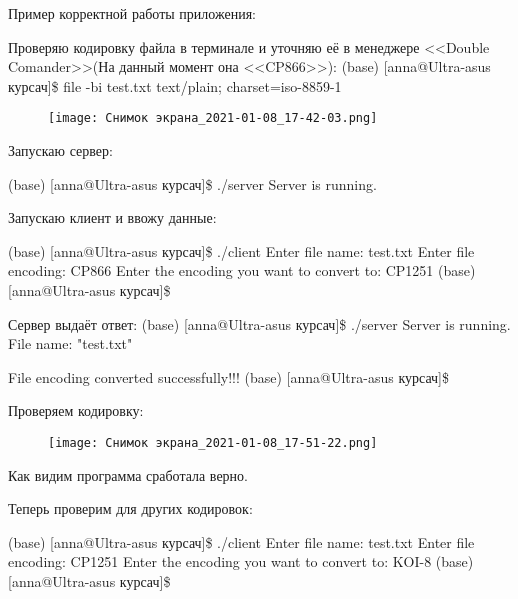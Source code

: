 \documentclass[a4paper,12pt]{extarticle}
\begin{document}
Пример корректной работы приложения:

Проверяю кодировку файла в терминале и уточняю её в менеджере <<Double Comander>>(На данный момент она <<CP866>>):
(base) [anna@Ultra-asus курсач]\$ file -bi test.txt \newline
text/plain; charset=iso-8859-1 \newline
\begin{figure}[h!]
\centering
\texttt{[image: Снимок экрана\_2021-01-08\_17-42-03.png]}
\label{fig:cube}
\end{figure}

Запускаю сервер:

(base) [anna@Ultra-asus курсач]\$ ./server \newline
Server is running.\newline

Запускаю клиент и ввожу данные:

(base) [anna@Ultra-asus курсач]\$ ./client \newline
Enter file name: test.txt \newline
Enter file encoding: CP866 \newline
Enter the encoding you want to convert to: CP1251 \newline
(base) [anna@Ultra-asus курсач]\$ \newline

Сервер выдаёт ответ:
(base) [anna@Ultra-asus курсач]\$ ./server \newline
Server is running.\newline
File name: "test.txt"\newline


File encoding converted successfully!!!\newline
(base) [anna@Ultra-asus курсач]\$\newline

Проверяем кодировку:

\begin{figure}[h!]
\centering
\texttt{[image: Снимок экрана\_2021-01-08\_17-51-22.png]}
\label{fig:cube}
\end{figure}

Как видим программа сработала верно.

Теперь проверим для других кодировок:

(base) [anna@Ultra-asus курсач]\$ ./client \newline
Enter file name: test.txt\newline
Enter file encoding: CP1251\newline
Enter the encoding you want to convert to: KOI-8 \newline
(base) [anna@Ultra-asus курсач]\$ \newline
\end{document}
